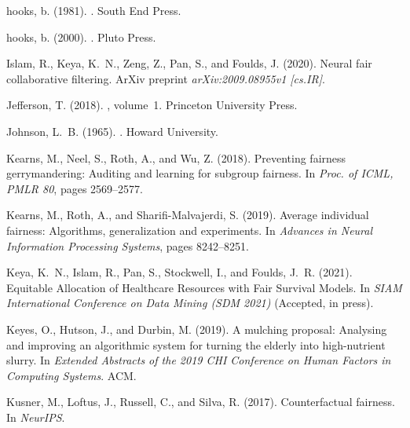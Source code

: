 \documentclass[11pt,dvipdfm]{article}
\begin{document}
\begin{thebibliography}{}
	hooks, b. (1981).
	.
	\newblock South End Press.
	
	hooks, b. (2000).
	.
	\newblock Pluto Press.
	
	Islam, R., Keya, K.~N., Zeng, Z., Pan, S., and Foulds, J. (2020).
	\newblock Neural fair collaborative filtering. 
	\newblock ArXiv preprint {\em arXiv:2009.08955v1 [cs.IR]}.
	
	Jefferson, T. (2018).
	, volume~1.
	\newblock Princeton University Press.
	
	Johnson, L.~B. (1965).
	.
	\newblock Howard University.
	
	Kearns, M., Neel, S., Roth, A., and Wu, Z. (2018).
	\newblock Preventing fairness gerrymandering: Auditing and learning for
	subgroup fairness.
	\newblock In {\em Proc. of ICML, PMLR 80}, pages 2569--2577.
	
	Kearns, M., Roth, A., and Sharifi-Malvajerdi, S. (2019).
	\newblock Average individual fairness: Algorithms, generalization and
	experiments.
	\newblock In {\em Advances in Neural Information Processing Systems}, pages
	8242--8251.
	
	Keya, K.~N., Islam, R., Pan, S., Stockwell, I., and Foulds, J.~R. (2021).
	\newblock Equitable Allocation of Healthcare Resources with Fair Survival Models.
	\newblock In {\em SIAM International Conference on Data Mining (SDM 2021)} (Accepted, in press).
	
	Keyes, O., Hutson, J., and Durbin, M. (2019).
	\newblock A mulching proposal: Analysing and improving an algorithmic system
	for turning the elderly into high-nutrient slurry.
	\newblock In {\em Extended Abstracts of the 2019 CHI Conference on Human
		Factors in Computing Systems}. ACM.
	
	Kusner, M., Loftus, J., Russell, C., and Silva, R. (2017).
	\newblock Counterfactual fairness.
	\newblock In {\em NeurIPS}.
	

\end{thebibliography}
\end{document}
